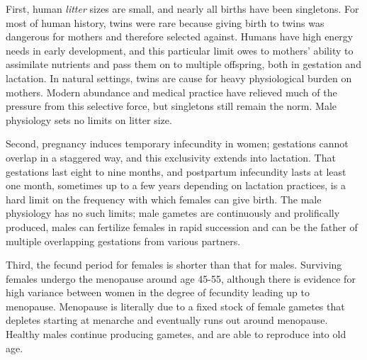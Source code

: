 \documentclass[reqno,12pt,oneside,a4paper]{report} %
\theoremstyle{plain}
\theoremstyle{definition}
\theoremstyle{remark}
\numberwithin{theorem}{chapter}     %
\begin{document}
First, human \textit{litter} sizes are small, and nearly all births have been singletons. For most of human history, twins were rare because giving birth to twins was dangerous for mothers and therefore selected against. Humans have high energy needs in early development, and this particular limit owes to mothers' ability to assimilate nutrients and pass them on to multiple offspring, both in gestation and lactation. In natural settings, twins are cause for heavy physiological burden on mothers. Modern abundance and medical practice have relieved much of the pressure from this selective force, but singletons still remain the norm. Male physiology sets no limits on litter size.

Second, pregnancy induces temporary infecundity in women; gestations cannot overlap in a staggered way, and this exclusivity extends into lactation. That gestations last eight to nine months, and postpartum infecundity lasts at least one month, sometimes up to a few years depending on lactation practices, is a hard limit on the frequency with which females can give birth. The male physiology has no such limits; male gametes are continuously and prolifically produced, males can fertilize females in rapid succession and can be the father of multiple overlapping gestations from various partners.

Third, the fecund period for females is shorter than that for males. Surviving females undergo the menopause around age 45-55, although there is evidence for high variance between women in the degree of fecundity leading up to menopause. Menopause is literally due to a fixed stock of female gametes that depletes starting at menarche and eventually runs out around menopause. Healthy males continue producing gametes, and are able to reproduce into old age.
\end{document}

